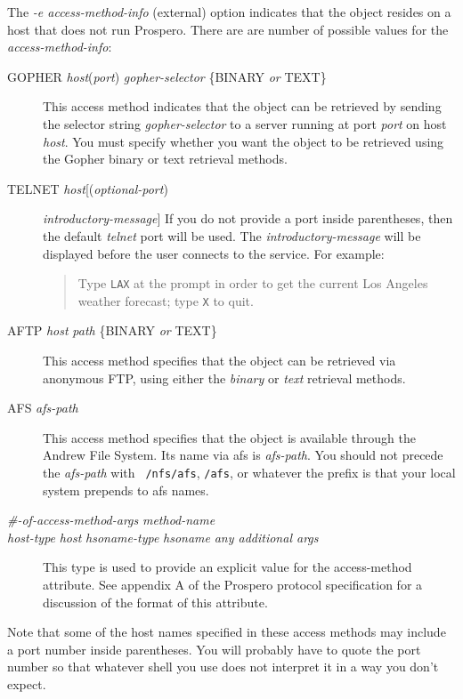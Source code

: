 The {\em -e access-method-info} (external) option indicates that the
object resides on a host that does not run Prospero.  There are are
number of possible values for the {\em access-method-info}:
\begin{description}
\item[GOPHER {\em host}({\em port}) {\em gopher-selector} \{BINARY {\em or} TEXT\}]
This access method indicates that the object can be retrieved by
sending the selector string {\em gopher-selector} to a server running
at port {\em port} on host {\em host}.  You must specify whether you
want the object to be retrieved using the Gopher binary or text
retrieval methods.
\item[TELNET {\em host}[({\em optional-port})] {\em introductory-message}]
If you do not provide a port inside parentheses, then the default {\em
telnet} port will be used.  The {\em introductory-message} will be
displayed before the user connects to the service.  For example:
\begin{quote}
Type {\tt LAX} at the prompt in order to get the current Los Angeles weather
forecast; type {\tt X} to quit.
\end{quote}
\item[AFTP {\em host} {\em path} \{BINARY {\em or} TEXT\}]  This access method
specifies that the object can be retrieved via anonymous FTP, using
either the {\em binary} or {\em text} retrieval methods.
\item[AFS {\em afs-path}]  This access method specifies that the object is
available through the Andrew File System.  Its name via {\sc afs} is {\em
afs-path}.  You should not precede the {\em afs-path} with {\tt
/nfs/afs}, {\tt /afs}, or whatever the prefix is that your local
system prepends to {\sc afs} names.
\item[{\em \#-of-access-method-args} {\em method-name} \\
{\em host-type} {\em host} {\em hsoname-type} {\em hsoname} {\em any additional args}]
This type is used to provide an explicit value for the {\sc access-method}
attribute.  See appendix A of the Prospero protocol specification for
a discussion of the format of this attribute.  

\end{description}

Note that some of the host names specified in these access methods may
include a port number inside parentheses.  You will probably have to
quote the port number so that whatever shell you use does not
interpret it in a way you don't expect.

